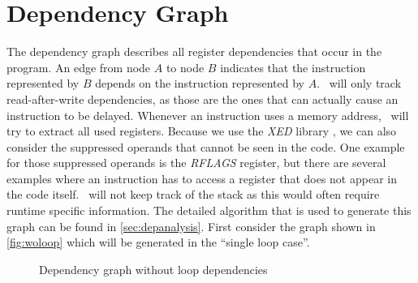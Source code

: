 \FloatBarrier

\section{Dependency Graph}
The dependency graph describes all register dependencies that occur in the program. An edge from node $A$ to node $B$ indicates that the instruction represented by $B$ depends on the instruction represented by $A$. \suaca\ will only track read-after-write dependencies, as those are the ones that can actually cause an instruction to be delayed. Whenever an instruction uses a memory address, \suaca\ will try to extract all used registers. Because we use the \emph{XED} library \cite{xed}, we can also consider the suppressed operands that cannot be seen in the code. One example for those suppressed operands is the \emph{RFLAGS} register, but there are several examples where an instruction has to access a register that does not appear in the code itself. \suaca\ will not keep track of the stack as this would often require runtime specific information. The detailed algorithm that is used to generate this graph can be found in \autoref{sec:depanalysis}. First consider the graph shown in \autoref{fig:woloop} which will be generated in the ``single loop case''.\\

\setlength{\abovecaptionskip}{-5pt}
\begin{figure}
\centering
{}
\caption{Dependency graph without loop dependencies}
\label{fig:woloop}
\end{figure}


